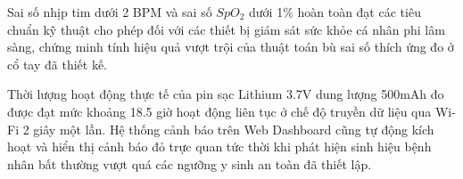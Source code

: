 Sai số nhịp tim dưới 2 BPM và sai số $SpO_2$ dưới 1\% hoàn toàn đạt các tiêu chuẩn kỹ thuật cho phép đối với các thiết bị giám sát sức khỏe cá nhân phi lâm sàng, chứng minh tính hiệu quả vượt trội của thuật toán bù sai số thích ứng đo ở cổ tay đã thiết kế.

Thời lượng hoạt động thực tế của pin sạc Lithium 3.7V dung lượng 500mAh đo được đạt mức khoảng 18.5 giờ hoạt động liên tục ở chế độ truyền dữ liệu qua Wi-Fi 2 giây một lần. Hệ thống cảnh báo trên Web Dashboard cũng tự động kích hoạt và hiển thị cảnh báo đỏ trực quan tức thời khi phát hiện sinh hiệu bệnh nhân bất thường vượt quá các ngưỡng y sinh an toàn đã thiết lập.
